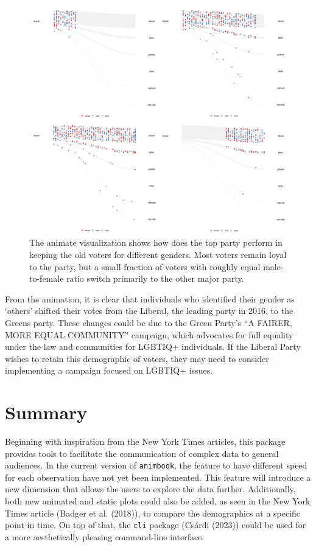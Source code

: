 \begin{figure}

{\centering \includegraphics[width=1\linewidth]{figures/animation-voter} 

}

\caption{The animate visualization shows how does the top party perform in keeping the old voters for different genders. Most voters remain loyal to the party, but a small fraction of voters with roughly equal male-to-female ratio switch primarily to the other major party.}\label{fig:voter-figure}
\end{figure}

From the animation, it is clear that individuals who identified their gender as `others' shifted their votes from the Liberal, the leading party in 2016, to the Greens party. These changes could be due to the Green Party's ``A FAIRER, MORE EQUAL COMMUNITY'' campaign, which advocates for full equality under the law and communities for LGBTIQ+ individuals. If the Liberal Party wishes to retain this demographic of voters, they may need to consider implementing a campaign focused on LGBTIQ+ issues.

\hypertarget{summary}{%
\section{Summary}\label{summary}}

Beginning with inspiration from the New York Times articles, this package provides tools to facilitate the communication of complex data to general audiences. In the current version of \texttt{animbook}, the feature to have different speed for each observation have not yet been implemented. This feature will introduce a new dimension that allows the users to explore the data further. Additionally, both new animated and static plots could also be added, as seen in the New York Times article (Badger et al. (2018)), to compare the demographics at a specific point in time. On top of that, the \texttt{cli} package (Csárdi (2023)) could be used for a more aesthetically pleasing command-line interface.

